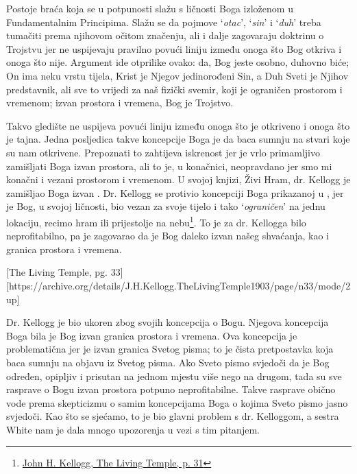 Postoje braća koja se u potpunosti slažu s ličnosti Boga izloženom u Fundamentalnim Principima. Slažu se da pojmove ‘\textit{otac}’, ‘\textit{sin}’ i ‘\textit{duh}’ treba tumačiti prema njihovom očitom značenju, ali i dalje zagovaraju doktrinu o Trojstvu jer ne uspijevaju pravilno povući liniju između onoga što Bog otkriva i onoga što nije. Argument ide otprilike ovako: da, Bog jeste osobno, duhovno biće; On ima neku vrstu tijela, Krist je Njegov jedinorođeni Sin, a Duh Sveti je Njihov predstavnik, ali sve to vrijedi za naš fizički svemir, koji je ograničen prostorom i vremenom; izvan prostora i vremena, Bog je Trojstvo.

Takvo gledište ne uspijeva povući liniju između onoga što je otkriveno i onoga što je tajna. Jedna posljedica takve koncepcije Boga je da baca sumnju na stvari koje su nam otkrivene. Prepoznati to zahtijeva iskrenost jer je vrlo primamljivo zamišljati Boga izvan prostora, ali to je, u konačnici, neopravdano jer smo mi konačni i vezani prostorom i vremenom. U svojoj knjizi, Živi Hram, dr. Kellogg je zamišljao Boga izvan . Dr. Kellogg se protivio koncepciji Boga prikazanoj u , jer je Bog, u svojoj ličnosti, bio vezan za svoje tijelo i tako ‘\textit{ograničen}’ na jednu lokaciju, recimo hram ili prijestolje na nebu\footnote{\href{https://archive.org/details/J.H.Kellogg.TheLivingTemple1903/page/n31/mode/2up}{John H. Kellogg, The Living Temple, p. 31}}. To je za dr. Kellogga bilo neprofitabilno, pa je zagovarao da je Bog daleko izvan našeg shvaćanja, kao i granica prostora i vremena.

[The Living Temple, pg. 33][https://archive.org/details/J.H.Kellogg.TheLivingTemple1903/page/n33/mode/2up]

Dr. Kellogg je bio ukoren zbog svojih koncepcija o Bogu. Njegova koncepcija Boga bila je Bog izvan granica prostora i vremena. Ova koncepcija je problematična jer je izvan granica Svetog pisma; to je čista pretpostavka koja baca sumnju na objavu iz Svetog pisma. Ako Sveto pismo svjedoči da je Bog određen, opipljiv i prisutan na jednom mjestu više nego na drugom, tada su sve rasprave o Bogu izvan prostora potpuno neprofitabilne. Takve rasprave obično vode prema skepticizmu o samim koncepcijama Boga o kojima Sveto pismo jasno svjedoči. Kao što se sjećamo, to je bio glavni problem s dr. Kelloggom, a sestra White nam je dala mnogo upozorenja u vezi s tim pitanjem.

